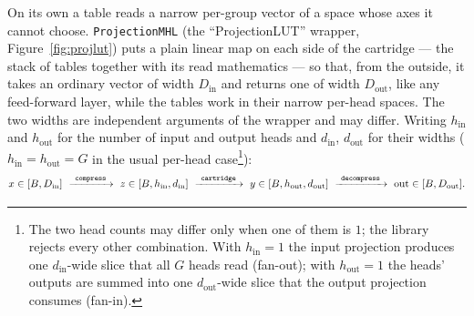 \documentclass[11pt]{article}
\DeclareRobustCommand{\code}[1]{{\renewcommand{\_}{\textunderscore\allowbreak}\texttt{#1}}}
\begin{document}
On its own a table reads a narrow per-group vector of a space whose axes it cannot choose.
\code{ProjectionMHL} (the ``ProjectionLUT'' wrapper, Figure~\ref{fig:projlut}) puts a plain linear map on
each side of the cartridge --- the stack of tables together with its read mathematics --- so that, from
the outside, it takes an ordinary vector of width $D_\text{in}$ and returns one of width $D_\text{out}$,
like any feed-forward layer, while the tables work in their narrow per-head spaces. The two widths are
independent arguments of the wrapper and may differ. Writing $h_\text{in}$ and $h_\text{out}$ for the number of input and output heads and $d_\text{in}$,
$d_\text{out}$ for their widths ($h_\text{in}=h_\text{out}=G$ in the usual per-head case\footnote{The two head counts
may differ only when one of them is $1$; the library rejects every other combination. With
$h_\text{in}=1$ the input projection produces one $d_\text{in}$-wide slice that all $G$ heads read
(fan-out); with $h_\text{out}=1$ the heads' outputs are summed into one $d_\text{out}$-wide slice that
the output projection consumes (fan-in).}):
\[
  x\in[B,D_\text{in}]\ \xrightarrow{\ \code{compress}\ }\ z\in[B,h_\text{in},d_\text{in}]
  \ \xrightarrow{\ \code{cartridge}\ }\ y\in[B,h_\text{out},d_\text{out}]
  \ \xrightarrow{\ \code{decompress}\ }\ \text{out}\in[B,D_\text{out}].
\]
\end{document}

